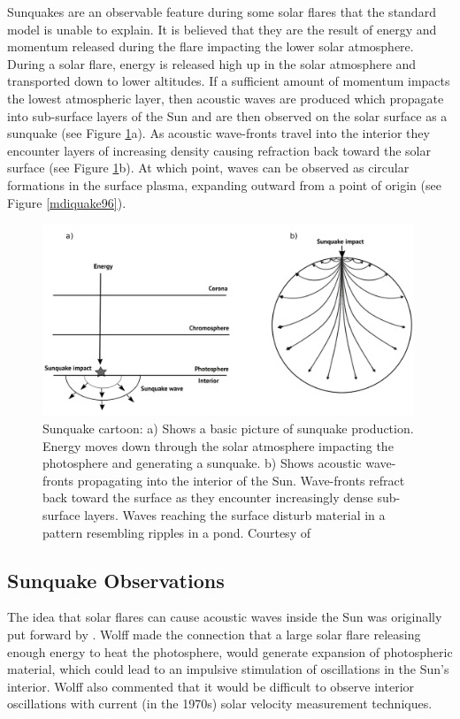 Sunquakes are an observable feature during some solar flares that the standard model is unable to explain. It is believed that they are the result of energy and momentum released during the flare impacting the lower solar atmosphere. During a solar flare, energy is released high up in the solar atmosphere and transported down to lower altitudes. If a sufficient amount of momentum impacts the lowest atmospheric layer, then acoustic waves are produced which propagate into sub-surface layers of the Sun and are then observed on the solar surface as a sunquake (see Figure \ref{sunquake-cartoon}a). As acoustic wave-fronts travel into the interior they encounter layers of increasing density causing refraction back toward the solar surface (see Figure \ref{sunquake-cartoon}b). At which point, waves can be observed as circular formations in the surface plasma, expanding outward from a point of origin (see Figure \ref{mdiquake96}).


\begin{figure}[hb]%
  \begin{center}
  \includegraphics[width=0.99\textwidth]{sunquake-cartoon}
  \caption{Sunquake cartoon: a) Shows a basic picture of sunquake production. Energy moves down through the solar atmosphere impacting the photosphere and generating a sunquake. b) Shows acoustic wave-fronts propagating into the interior of the Sun. Wave-fronts refract back toward the surface as they encounter increasingly dense sub-surface layers. Waves reaching the surface disturb material in a pattern resembling ripples in a pond. Courtesy of \cite{2014arXiv1402.1249K}}\label{sunquake-cartoon}
\end{center}
\end{figure}

\subsection{Sunquake Observations}
The idea that solar flares can cause acoustic waves inside the Sun was originally put forward by \citep{1972ApJ...176..833W}. Wolff made the connection that a large solar flare releasing enough energy to heat the photosphere, would generate expansion of photospheric material, which could lead to an impulsive stimulation of oscillations in the Sun's interior. Wolff also commented that it would be difficult to observe interior oscillations with current (in the 1970s) solar velocity measurement techniques.

